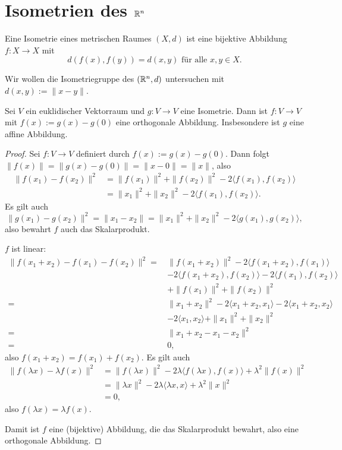\setcounter{secnumdepth}{1}
\section{Isometrien des \texorpdfstring{$\mathbb{R}^n$}{Rn}}
\setcounter{secnumdepth}{0}
Eine Isometrie eines metrischen Raumes $(X, d)$ ist eine bijektive Abbildung $f: X \to X$ mit
\[ d( f(x), f(y) ) = d(x,y) \text{ für alle } x, y \in X. \]

Wir wollen die Isometriegruppe des $(\mathbb{R}^n, d)$ untersuchen mit $d(x,y) := \| x - y \|$.

\begin{thm}
 Sei $V$ ein euklidischer Vektorraum und $g: V \to V$ eine Isometrie. Dann ist $f: V \to V$ mit $f(x) := g(x) - g(0)$ eine orthogonale Abbildung. Insbesondere ist $g$ eine affine Abbildung.
\end{thm}

\begin{proof}
 Sei $f: V \to V$ definiert durch $f(x) := g(x) - g(0)$. Dann folgt $\| f(x) \| = \| g(x) - g(0) \| = \| x - 0 \| = \| x \|$, also
 \begin{align*}
\| f(x_1) - f(x_2) \|^2 
    &= \| f(x_1) \|^2 + \| f(x_2) \|^2 - 2 \langle f(x_1), f(x_2) \rangle \\
    &= \| x_1 \|^2 + \| x_2 \|^2 - 2 \langle f(x_1), f(x_2) \rangle.
 \end{align*}
 Es gilt auch
 \[ \| g(x_1) - g(x_2) \|^2 = \| x_1 - x_2 \| = \| x_1 \|^2 + \| x_2 \|^2 - 2 \langle g(x_1), g(x_2) \rangle, \]
 also bewahrt $f$ auch das Skalarprodukt.
 
 $f$ ist linear:
 \begin{align*} \| f(x_1 + x_2) - f(x_1) - f(x_2) \|^2 
    =\, &\| f(x_1 + x_2) \|^2 
      - 2 \langle f(x_1 + x_2), f(x_1) \rangle \\
    & - 2 \langle f(x_1 + x_2), f(x_2) \rangle
      - 2 \langle f(x_1 ), f(x_2) \rangle \\
    & + \| f(x_1) \|^2 + \| f(x_2) \|^2 \\
    =\, &\| x_1 + x_2 \|^2 
      - 2 \langle x_1 + x_2, x_1 \rangle
      - 2 \langle x_1 + x_2, x_2 \rangle \\
    & - 2 \langle x_1, x_2 \rangle
      + \| x_1 \|^2 + \| x_2 \|^2 \\
    =\, &\| x_1 + x_2 - x_1 - x_2 \|^2 \\
    =\, &0,
 \end{align*}
 also $f(x_1 + x_2) = f(x_1) + f(x_2)$. Es gilt auch
 \begin{align*} \| f(\lambda x) - \lambda f(x) \|^2 &= \| f( \lambda x ) \|^2 
      - 2 \lambda \langle f( \lambda x ), f( x ) \rangle 
      + \lambda^2 \| f(x) \|^2 \\
    &= \| \lambda x \|^2
      - 2 \lambda \langle \lambda x, x \rangle
      + \lambda^2 \| x \|^2 \\
    &= 0,
 \end{align*}
 also $f(\lambda x) = \lambda f(x)$.
 
 Damit ist $f$ eine (bijektive) Abbildung, die das Skalarprodukt bewahrt, also eine orthogonale Abbildung.
\end{proof}


